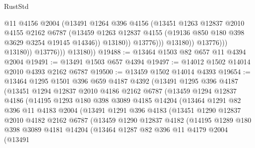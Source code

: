 \begin{lexlean}{RustStd}
\begin{coremodule}
{\begin{coremodule}
{{{{{{{{{{{{{{{{{{{{{{{{{{{{{{{                                  @11
                                  @4156
                                  @2004
                                  (@13491
                                    @1264
                                    @396
                                    @4156
                                    (@13451
                                      @1263
                                      @12837
                                      @2010
                                      @4155
                                      @2162
                                      @6787
                                      (@13459
                                        @1263
                                        @12837
                                        @4155
                                        (@19136 @850 @180 @398 @3629 @3254 @19145 @14346))
                                      @13180))
                                  @13776)))
                            @13180))
                        @13776)))
                  @13180))
              @13776)))
        @13180))
@19488 := @13464 @1503 @82 @657 @11 @4394 @2004
@19491 := @13491 @1503 @657 @4394
@19497 := @14012 @1502 @14014 @2010 @4393 @2162 @6787
@19500 := @13459 @1502 @14014 @4393
@19654 := @13464
    @1295
    @1501
    @396
    @659
    @4187
    @4392
    (@13491
      @1295
      @396
      @4187
      (@13451
        @1294
        @12837
        @2010
        @4186
        @2162
        @6787
        (@13459
          @1294
          @12837
          @4186
          (@14195
            @1293
            @180
            @398
            @3089
            @4185
            @14204
            (@13464
              @1291
              @82
              @396
              @11
              @4183
              @2004
              (@13491
                @1291
                @396
                @4183
                (@13451
                  @1290
                  @12837
                  @2010
                  @4182
                  @2162
                  @6787
                  (@13459
                    @1290
                    @12837
                    @4182
                    (@14195
                      @1289
                      @180
                      @398
                      @3089
                      @4181
                      @14204
                      (@13464
                        @1287
                        @82
                        @396
                        @11
                        @4179
                        @2004
                        (@13491
}}}}}}}}}}}}}}}}}}}}}}}}}}}}}}}
\end{coremodule}}
\end{coremodule}
\end{lexlean}
